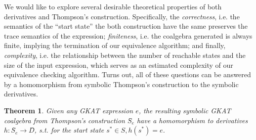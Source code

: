 \documentclass[conference]{IEEEtran}
\newtheorem{theorem}{Theorem}
\begin{document}
We would like to explore several desirable theoretical properties of both derivatives and Thompson's construction.
Specifically, the \emph{correctness}, i.e. the semantics of the ``start state'' the both construction have the same preserves the trace semantics of the expression; \emph{finiteness}, i.e. the coalgebra generated is always finite, implying the termination of our equivalence algorithm; and finally, \emph{complexity}, i.e. the relationship between the number of reachable states and the size of the input expression, which serves as an estimated complexity of our equivalence checking algorithm.
Turns out, all of these questions can be answered by a homomorphism from symbolic Thompson's construction to the symbolic derivatives.

\begin{theorem}\label{thm:hom-thompson-derivative}
    Given any GKAT expression \(e\), the resulting symbolic GKAT coalgebra from Thompson's construction \(Ŝ_e\) have a homomorphism to derivatives \(h: Ŝ_e → D̂\), s.t. for the start state \(s^* ∈ S, h(s^*) = e\).
\end{theorem}
\end{document}

